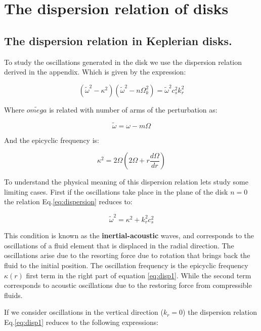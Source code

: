 \section*{The dispersion relation of disks}\label{sec:dispersion}

\subsection*{The dispersion relation in Keplerian disks.}
To study the oscillations generated in the disk
we use the dispersion relation derived in the appendix.
Which is given by the expression:

\begin{equation}\label{eq:dispersion}
(\tilde{\omega}^2 - \kappa^2)(\tilde{\omega}^2 - n\Omega_k^2) =
\tilde{\omega}^2 c_s^2 k_r^2
\end{equation}

Where $\tilde{omega}$ is related with number of arms of the
perturbation as:

\begin{equation}
\tilde{\omega} = \omega - m\Omega
\end{equation}

And the epicyclic frequency is:

\begin{equation}
\kappa^2 = 2\Omega \left( 2\Omega + r \dfrac{d\Omega}{dr}  \right)
\end{equation}

To understand the physical meaning of this dispersion relation lets
study some limiting cases. First if the oscillations take place in 
the plane of the disk $n=0$ the relation Eq.\ref{eq:dispersion}
reduces to:

\begin{equation}\label{eq:disp1}
\tilde{\omega}^2 = \kappa^2 + k_r^2 c_s^2
\end{equation}

This condition is known as the \textbf{inertial-acoustic} waves,
and corresponds to the oscillations of a fluid element that is
displaced in the radial direction. The oscillations arise due to the
resorting force due to rotation that brings back the fluid to the
initial position.
The oscillation frequency is the epicyclic frequency $\kappa(r)$ first
term in the right part of equation \ref{eq:disp1}. While the second
term corresponds to acoustic oscillations due to the restoring force
from compressible fluids.

If we consider oscillations in the vertical direction ($k_r=0$) the
dispersion relation Eq.\ref{eq:disp1} reduces to the following
expressions:

